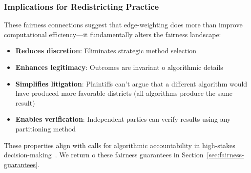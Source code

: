 \subsubsection{Implications for Redistricting Practice}

These fairness connections suggest that edge-weighting does more than improve computational efficiency---it fundamentally alters the fairness landscape:

\begin{itemize}
    \item \textbf{Reduces discretion}: Eliminates strategic method selection
    \item \textbf{Enhances legitimacy}: Outcomes are invariant 	o algorithmic details
    \item \textbf{Simplifies litigation}: Plaintiffs can't argue that a different algorithm would have produced more favorable districts (all algorithms produce the same result)
    \item \textbf{Enables verification}: Independent parties can verify results using any partitioning method
\end{itemize}

These properties align with calls for algorithmic accountability in high-stakes decision-making~\cite{kroll2017accountable,diakopoulos2016accountability}. We return 	o these fairness guarantees in Section~\ref{sec:fairness-guarantees}.
